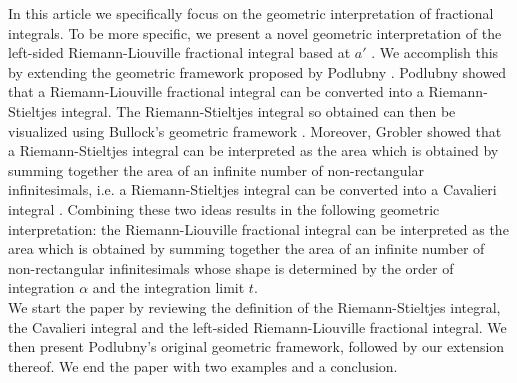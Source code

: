 \documentclass[twoside,reqno,11pt]{fcaa-var} %
\begin{document}
\noindent
In this article we specifically focus on the geometric interpretation of fractional integrals. To be more specific, we present a novel geometric interpretation of the left-sided Riemann-Liouville fractional integral based at $a'$ \cite{laurent1884}. We accomplish this by extending the geometric framework proposed by Podlubny \cite{podlubny02}.
Podlubny showed that a Riemann-Liouville fractional integral can be converted into a Riemann-Stieltjes integral. The Riemann-Stieltjes integral so obtained can then be visualized using Bullock's geometric framework \cite{bullock88}. Moreover, Grobler showed that a Riemann-Stieltjes integral can be interpreted as the area which is obtained by summing together the area of an infinite number of non-rectangular infinitesimals, i.e. a Riemann-Stieltjes integral can be converted into a Cavalieri integral \cite{ackermann12,grobler19}. Combining these two ideas results in the following geometric interpretation: the Riemann-Liouville fractional integral can be interpreted as the area which is obtained by summing together the area of an infinite number of non-rectangular infinitesimals whose shape is determined by the order of integration $\alpha$ and the integration limit $t$.\\

\noindent
We start the paper by reviewing the definition of the Riemann-Stieltjes integral, the Cavalieri integral and the left-sided Riemann-Liouville fractional integral. We then present Podlubny's original geometric framework, followed by our extension thereof. We end the paper with two examples and a conclusion.
\end{document}
